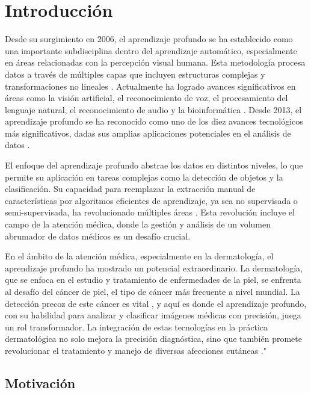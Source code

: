 \chapter*{Introducción}\label{chapter:introduction}

Desde su surgimiento en 2006, el aprendizaje profundo se ha establecido como una importante subdisciplina dentro del aprendizaje automático, especialmente en áreas relacionadas con la percepción visual humana. Esta metodología procesa datos a través de múltiples capas que incluyen estructuras complejas y transformaciones no lineales . Actualmente ha logrado avances significativos en áreas como la visión artificial, el reconocimiento de voz, el procesamiento del lenguaje natural, el reconocimiento de audio y la bioinformática . Desde 2013, el aprendizaje profundo se ha reconocido como uno de los diez avances tecnológicos más significativos, dadas sus amplias aplicaciones potenciales en el análisis de datos .

El enfoque del aprendizaje profundo abstrae los datos en distintos niveles, lo que permite su aplicación en tareas complejas como la detección de objetos y la clasificación. Su capacidad para reemplazar la extracción manual de características por algoritmos eficientes de aprendizaje, ya sea no supervisada o semi-supervisada, ha revolucionado múltiples áreas . Esta revolución incluye el campo de la atención médica, donde la gestión y análisis de un volumen abrumador de datos médicos es un desafío crucial.

En el ámbito de la atención médica, especialmente en la dermatología, el aprendizaje profundo ha mostrado un potencial extraordinario. La dermatología, que se enfoca en el estudio y tratamiento de enfermedades de la piel, se enfrenta al desafío del cáncer de piel, el tipo de cáncer más frecuente a nivel mundial. La detección precoz de este cáncer es vital , y aquí es donde el aprendizaje profundo, con su habilidad para analizar y clasificar imágenes médicas con precisión, juega un rol transformador. La integración de estas tecnologías en la práctica dermatológica no solo mejora la precisión diagnóstica, sino que también promete revolucionar el tratamiento y manejo de diversas afecciones cutáneas ."

\section*{Motivación}

